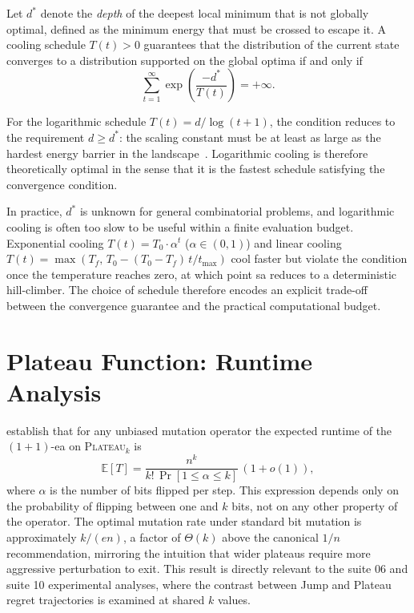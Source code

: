 \begin{theorem}[Haj\'{e}k 1988]
  Let $d^{*}$ denote the \emph{depth} of the deepest local minimum
  that is not globally optimal, defined as the minimum energy that
  must be crossed to escape it. A cooling schedule $T(t) > 0$
  guarantees that the distribution of the current state converges to
  a distribution supported on the global optima if and only if
  \[
    \sum_{t=1}^{\infty}
    \exp\!\left(\frac{-d^{*}}{T(t)}\right) = +\infty.
  \]
\end{theorem}

For the logarithmic schedule $T(t) = d / \log(t + 1)$, the condition
reduces to the requirement $d \geq d^{*}$: the scaling constant must
be at least as large as the hardest energy barrier in the
landscape~\cite{hajek1988cooling,bertsimas1993simulated}. Logarithmic
cooling is therefore theoretically optimal in the sense that it is
the fastest schedule satisfying the convergence condition.

In practice, $d^{*}$ is unknown for general combinatorial problems,
and logarithmic cooling is often too slow to be useful within a
finite evaluation budget. Exponential cooling
$T(t) = T_0 \cdot \alpha^t$ ($\alpha \in (0,1)$) and linear cooling
$T(t) = \max(T_f,\, T_0 - (T_0 - T_f)\,t/t_{\max})$ cool faster but
violate the condition once the temperature reaches zero, at which
point \acrshort{sa} reduces to a deterministic hill-climber. The
choice of schedule therefore encodes an explicit trade-off between
the convergence guarantee and the practical computational budget.

\section{Plateau Function: Runtime Analysis}
\label{app:plateau-runtime}

\citet{antipov2021precise} establish that for any unbiased mutation
operator the expected runtime of the $(1+1)$-\acrshort{ea} on
\textsc{Plateau}$_k$ is
\[
  \mathbb{E}[T]
  = \frac{n^k}{k!\,\Pr[1 \leq \alpha \leq k]}\,(1 + o(1)),
\]
where $\alpha$ is the number of bits flipped per step. This
expression depends only on the probability of flipping between one
and $k$ bits, not on any other property of the operator. The optimal
mutation rate under standard bit mutation is approximately $k/(en)$,
a factor of $\Theta(k)$ above the canonical $1/n$ recommendation,
mirroring the intuition that wider plateaus require more aggressive
perturbation to exit. This result is directly relevant to the suite
06 and suite 10 experimental analyses, where the contrast between
Jump and Plateau regret trajectories is examined at shared $k$ values.
